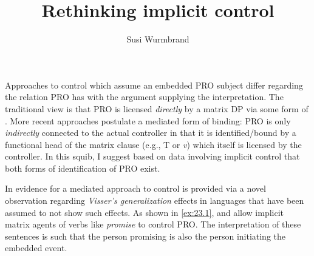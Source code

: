 \documentclass[output=paper]{langsci/langscibook}
\author{Susi Wurmbrand\affiliation{University of Vienna}}
\title{Rethinking implicit control}
\begin{document}
\glsresetall
\maketitle

\noindent Approaches to control which assume an embedded PRO subject differ
regarding the relation PRO has with the argument supplying the interpretation.
The traditional view is that PRO is licensed \emph{directly} by a matrix DP via
some form of . More recent approaches postulate a mediated form of
binding: PRO is only \emph{indirectly} connected to the actual controller in
that it is identified/bound by a functional head of the matrix clause (e.g., T
or \emph{v}) which itself is licensed by the controller. In this squib, I
suggest based on data involving implicit control that both forms of
identification of PRO exist.

In \textcite{vanUrk2013} evidence for a mediated approach to control is
provided via a novel observation regarding \emph{Visser’s generalization}
effects in languages that have been assumed to not show such effects. As shown
in \eqref{ex:23.1},  and  allow implicit matrix
agents of verbs like \emph{promise} to control PRO. The interpretation of these
sentences is such that the person promising is also the person initiating the
embedded event.\newpage
\end{document}
